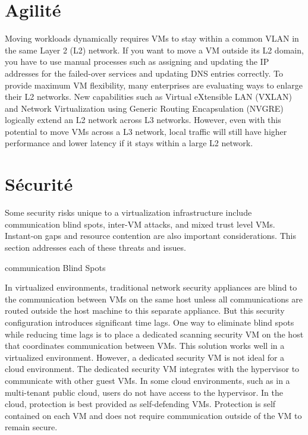\section{Agilité}

Moving workloads dynamically requires VMs to stay within a common VLAN in the same Layer 2 (L2) network. If you want to move a VM outside its L2 domain, you have to use manual processes such as assigning and updating the IP addresses for the failed-over services and updating DNS entries correctly. To provide maximum VM flexibility, many enterprises are evaluating ways to enlarge their L2 networks.
New capabilities such as Virtual eXtensible LAN (VXLAN) and Network Virtualization using Generic Routing Encapsulation (NVGRE) logically extend an L2 network across L3 networks. However, even with this potential to move VMs across a L3 network, local traffic will still have higher performance and lower latency if it stays within a large L2 network.

\section{Sécurité}

Some security risks unique to a virtualization infrastructure include communication blind spots, inter-VM attacks, and mixed trust level VMs. Instant-on gaps and resource contention are also important considerations. This section addresses each of these threats and issues.

communication Blind Spots

In virtualized environments, traditional network security appliances are blind to the communication between VMs on the same host unless all communications are routed outside the host machine to this separate appliance. But this security configuration introduces significant time lags. One way to eliminate blind spots while reducing time lags is to place a dedicated scanning security VM on the host that coordinates communication between VMs. This solution works well in a virtualized environment. However, a dedicated security VM is not ideal for a cloud environment. The dedicated security VM integrates with the hypervisor to communicate with other guest VMs. In some cloud environments, such as in a multi-tenant public cloud, users do not have access to the hypervisor. In the cloud, protection is best provided as self-defending VMs. Protection is self contained on each VM and does not require communication outside of the VM to remain secure.

